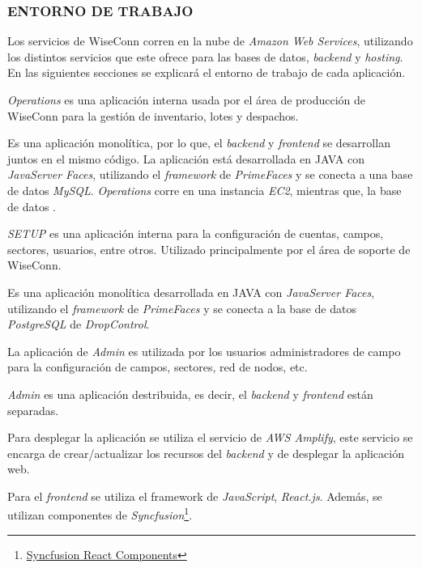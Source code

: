 \subsubsection{ENTORNO DE TRABAJO}

Los servicios de WiseConn corren en la nube de \textit{Amazon Web Services}, utilizando los distintos servicios que este ofrece para las bases de datos, \textit{backend} y \textit{hosting}. En las siguientes secciones se explicará el entorno de trabajo de cada aplicación.


\textit{Operations} es una aplicación interna usada por el área de producción de WiseConn para la gestión de inventario, lotes y despachos.

Es una aplicación monolítica, por lo que, el \textit{backend} y \textit{frontend} se desarrollan juntos en el mismo código. La aplicación está desarrollada en JAVA con \textit{JavaServer Faces}, utilizando el \textit{framework} de \textit{PrimeFaces} y se conecta a una base de datos \textit{MySQL}. \textit{Operations} corre en una instancia \textit{EC2}, mientras que, la base de datos .\


\textit{SETUP} es una aplicación interna para la configuración de cuentas, campos, sectores, usuarios, entre otros. Utilizado principalmente por el área de soporte de WiseConn.

Es una aplicación monolítica desarrollada en JAVA con \textit{JavaServer Faces}, utilizando el \textit{framework} de \textit{PrimeFaces} y se conecta a la base de datos \textit{PostgreSQL} de \textit{DropControl}.


La aplicación de \textit{Admin} es utilizada por los usuarios administradores de campo para la configuración de campos, sectores, red de nodos, etc.

\textit{Admin} es una aplicación destribuida, es decir, el \textit{backend} y \textit{frontend} están separadas. 

Para desplegar la aplicación se utiliza el servicio de \textit{AWS Amplify}, este servicio se encarga de crear/actualizar los recursos del \textit{backend} y de desplegar la aplicación web.

Para el \textit{frontend} se utiliza el framework de \textit{JavaScript}, \textit{React.js}. Además, se utilizan componentes de \textit{Syncfusion}\footnote{\href{https://www.syncfusion.com/react-components}{Syncfusion React Components}}.

